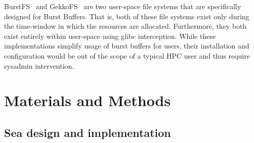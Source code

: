       BurstFS~\cite{burstfs} and GekkoFS~\cite{gekkofs} are two user-space file
      systems that are specifically designed for Burst Buffers. That is, both of
      these file systems exist only during the time-window in which the
      resources are allocated. Furthermore, they both exist entirely within
      user-space using glibc interception. While these implementations simplify
      usage of burst buffers for users, their installation and configuration would be out of the
      scope of a typical HPC user and thus require sysadmin intervention.

\section{Materials and Methods}

\subsection{Sea design and implementation}


